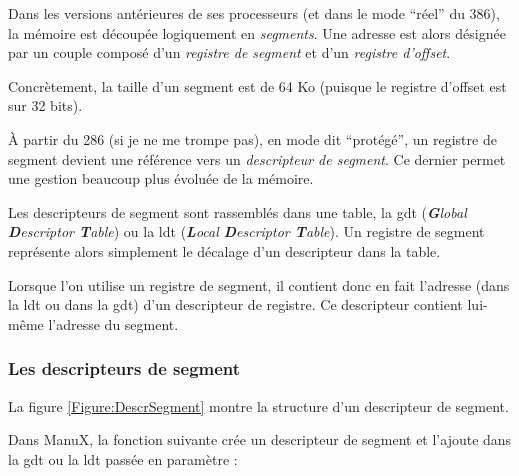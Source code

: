 
   Dans les versions antérieures de ses processeurs (et dans le mode
``réel'' du 386), la mémoire est découpée logiquement en {\em
segments}. Une adresse est alors désignée par un couple composé d'un
{\em registre de segment} et d'un {\em registre d'offset}.

   Concrètement, la taille d'un segment est de 64 Ko (puisque le
registre d'offset est sur 32 bits).

   À partir du 286 (si je ne me trompe pas), en mode dit ``protégé'', un
registre de segment devient une référence vers un {\em descripteur de
segment}. Ce dernier permet une gestion beaucoup plus évoluée de la
mémoire.

   Les descripteurs de segment sont rassemblés dans une table, la {\sc 
gdt} ({\em {\bf G}lobal {\bf D}escriptor {\bf T}able}) ou la {\sc ldt}
({\em {\bf L}ocal {\bf D}escriptor {\bf T}able}). Un registre de
segment représente alors simplement le décalage d'un descripteur dans
la table.

   Lorsque l'on utilise un registre de segment, il contient donc
en fait l'adresse (dans la {\sc ldt} ou dans la {\sc gdt}) d'un
descripteur de registre. Ce descripteur contient lui-même l'adresse du
segment.

\subsubsection{Les descripteurs de segment}

   La figure \ref{Figure:DescrSegment} montre la structure d'un
descripteur de segment.

   Dans ManuX, la fonction suivante crée un descripteur de segment et
l'ajoute dans la {\sc gdt} ou la {\sc ldt} passée en paramètre :


